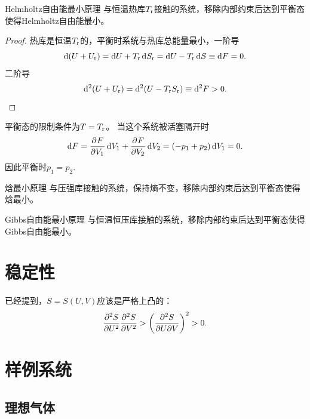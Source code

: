 \begin{theorem}
	{Helmholtz自由能最小原理}{}
	与恒温热库$T\rev$接触的系统，移除内部约束后达到平衡态使得Helmholtz自由能最小。
\end{theorem}

\begin{proof}
	热库是恒温$T\rev$的，平衡时系统与热库总能量最小，一阶导
	\[
		\d(U+U\rev)=\d U+T\rev\d S\rev=\d U-T\rev\d S\equiv\d F=0.
	\]
	二阶导
	\[
		\d^2(U+U\rev)=\d^2(U-T\rev S\rev)\equiv\d^2F>0.\qedhere
	\]
	
\end{proof}

\begin{corollary}
	平衡态的限制条件为$T=T\rev$。
	当这个系统被活塞隔开时
	\[
		\d F=\pv F{V_1}\d V_1+\pv F{V_2}\d V_2=(-p_1+p_2)\d V_1=0.
	\]
	因此平衡时$p_1=p_2.$
\end{corollary}

\begin{theorem}
	{焓最小原理}{}
	与压强库接触的系统，保持熵不变，移除内部约束后达到平衡态使得焓最小。
\end{theorem}

\begin{theorem}
	{Gibbs自由能最小原理}{}
	与恒温恒压库接触的系统，移除内部约束后达到平衡态使得Gibbs自由能最小。
\end{theorem}

\section{稳定性}

已经提到，$S=S(U,V)$应该是严格上凸的：
\begin{equation}
	\pv[2]SU\pv[2]SV>\biggkh{\pw SUV}^2>0.
\end{equation}

\section{样例系统}

\subsection{理想气体}

